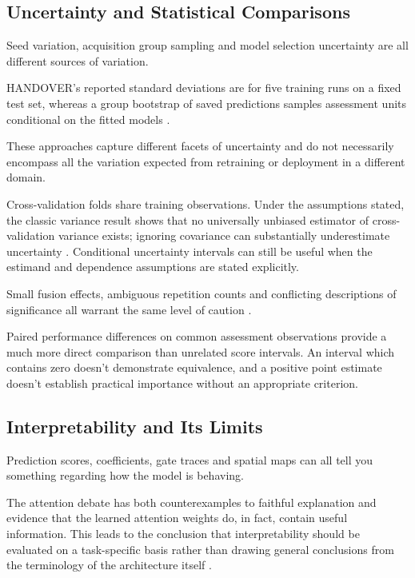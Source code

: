 \subsection{Uncertainty and Statistical Comparisons}

Seed variation, acquisition group sampling and model selection uncertainty are all different sources
of variation.

HANDOVER's reported standard deviations are for five training runs on a fixed test set, whereas a
group bootstrap of saved predictions samples assessment units conditional on the fitted models
\citep{Thoduka2024Handover}.

These approaches capture different facets of uncertainty and do not necessarily encompass all the
variation expected from retraining or deployment in a different domain.

Cross-validation folds share training observations. Under the assumptions stated, the classic
variance result shows that no universally unbiased estimator of cross-validation variance exists;
ignoring covariance can substantially underestimate uncertainty \citep[PDF
pp.~8--10]{Bengio2004CVVariance}. Conditional uncertainty intervals can still be useful when the
estimand and dependence assumptions are stated explicitly.

Small fusion effects, ambiguous repetition counts and conflicting descriptions of significance all
warrant the same level of caution \citep{Gu2024Improved,Xu2025ModalityResilient}.

Paired performance differences on common assessment observations provide a much more direct
comparison than unrelated score intervals. An interval which contains zero doesn't demonstrate
equivalence, and a positive point estimate doesn't establish practical importance without an
appropriate criterion.

\subsection{Interpretability and Its Limits}

Prediction scores, coefficients, gate traces and spatial maps can all tell you something regarding
how the model is behaving.

The attention debate has both counterexamples to faithful explanation and evidence that the learned
attention weights do, in fact, contain useful information. This leads to the conclusion that
interpretability should be evaluated on a task-specific basis rather than drawing general
conclusions from the terminology of the architecture itself \citep{P036}.

